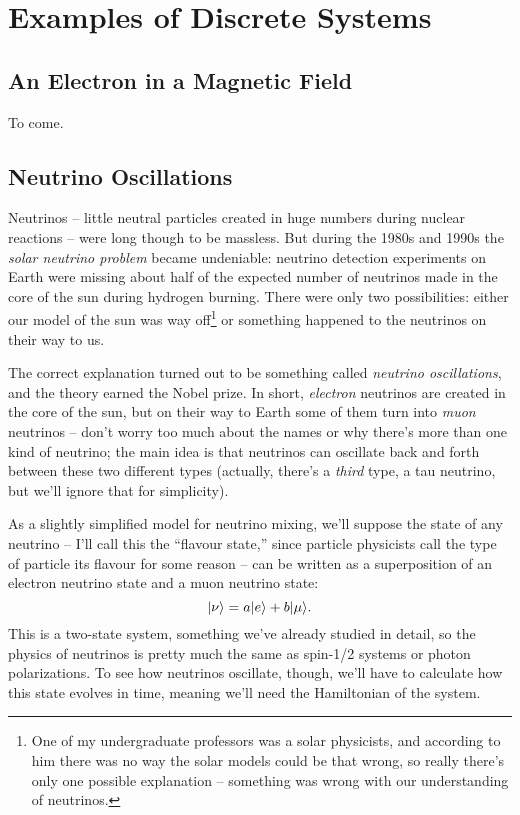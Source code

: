 \chapter{Examples of Discrete Systems}

\section{An Electron in a Magnetic Field}

To come.
%
%
%

\section{Neutrino Oscillations}

Neutrinos -- little neutral particles created in huge numbers during nuclear reactions -- were long though to be massless.  But during the 1980s and 1990s the \emph{solar neutrino problem} became undeniable: neutrino detection experiments on Earth were missing about half of the expected number of neutrinos made in the core of the sun during hydrogen burning.  There were only two possibilities:  either our model of the sun was way off\footnote{One of my undergraduate professors was a solar physicists, and according to him there was no way the solar models could be that wrong, so really there's only one possible explanation -- something was wrong with our understanding of neutrinos.} or something happened to the neutrinos on their way to us.

The correct explanation turned out to be something called \emph{neutrino oscillations}, and the theory earned the Nobel prize.  In short, \emph{electron} neutrinos are created in the core of the sun, but on their way to Earth some of them turn into \emph{muon} neutrinos -- don't worry too much about the names or why there's more than one kind of neutrino; the main idea is that neutrinos can oscillate back and forth between these two different types (actually, there's a \emph{third} type, a tau neutrino, but we'll ignore that for simplicity).

As a slightly simplified model for neutrino mixing, we'll suppose the state of any neutrino -- I'll call this the ``flavour state,'' since particle physicists call the type of particle its flavour for some reason -- can be written as a superposition of an electron neutrino state and a muon neutrino state:
\begin{equation}
| \nu \rangle = a | e \rangle + b | \mu \rangle.
\end{equation}
This is a two-state system, something we've already studied in detail, so the physics of neutrinos is pretty much the same as spin-1/2 systems or photon polarizations.  To see how neutrinos oscillate, though, we'll have to calculate how this state evolves in time, meaning we'll need the Hamiltonian of the system.

